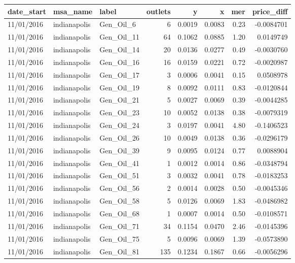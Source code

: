 \documentclass[
  letterpaper,
  DIV=11,
  numbers=noendperiod]{scrartcl}
\begin{document}
\begin{tabular}{l|l|l|r|r|r|r|r}
\hline
date\_start & msa\_name & label & outlets & y & x & mer & price\_diff\\
\hline
11/01/2016 & indianapolis & Gen\_Oil\_6 & 6 & 0.0019 & 0.0083 & 0.23 & -0.0084701\\
\hline
11/01/2016 & indianapolis & Gen\_Oil\_11 & 64 & 0.1062 & 0.0885 & 1.20 & 0.0149749\\
\hline
11/01/2016 & indianapolis & Gen\_Oil\_14 & 20 & 0.0136 & 0.0277 & 0.49 & -0.0030760\\
\hline
11/01/2016 & indianapolis & Gen\_Oil\_16 & 16 & 0.0159 & 0.0221 & 0.72 & -0.0020987\\
\hline
11/01/2016 & indianapolis & Gen\_Oil\_17 & 3 & 0.0006 & 0.0041 & 0.15 & 0.0508978\\
\hline
11/01/2016 & indianapolis & Gen\_Oil\_19 & 8 & 0.0092 & 0.0111 & 0.83 & -0.0120844\\
\hline
11/01/2016 & indianapolis & Gen\_Oil\_21 & 5 & 0.0027 & 0.0069 & 0.39 & -0.0044285\\
\hline
11/01/2016 & indianapolis & Gen\_Oil\_23 & 10 & 0.0052 & 0.0138 & 0.38 & -0.0079319\\
\hline
11/01/2016 & indianapolis & Gen\_Oil\_24 & 3 & 0.0197 & 0.0041 & 4.80 & -0.1406523\\
\hline
11/01/2016 & indianapolis & Gen\_Oil\_26 & 10 & 0.0049 & 0.0138 & 0.36 & -0.0296179\\
\hline
11/01/2016 & indianapolis & Gen\_Oil\_39 & 9 & 0.0095 & 0.0124 & 0.77 & 0.0088904\\
\hline
11/01/2016 & indianapolis & Gen\_Oil\_41 & 1 & 0.0012 & 0.0014 & 0.86 & -0.0348794\\
\hline
11/01/2016 & indianapolis & Gen\_Oil\_51 & 3 & 0.0032 & 0.0041 & 0.78 & -0.0183253\\
\hline
11/01/2016 & indianapolis & Gen\_Oil\_56 & 2 & 0.0014 & 0.0028 & 0.50 & -0.0045346\\
\hline
11/01/2016 & indianapolis & Gen\_Oil\_58 & 5 & 0.0126 & 0.0069 & 1.83 & -0.0486982\\
\hline
11/01/2016 & indianapolis & Gen\_Oil\_68 & 1 & 0.0007 & 0.0014 & 0.50 & -0.0108571\\
\hline
11/01/2016 & indianapolis & Gen\_Oil\_71 & 34 & 0.1154 & 0.0470 & 2.46 & -0.0145396\\
\hline
11/01/2016 & indianapolis & Gen\_Oil\_75 & 5 & 0.0096 & 0.0069 & 1.39 & -0.0573890\\
\hline
11/01/2016 & indianapolis & Gen\_Oil\_81 & 135 & 0.1234 & 0.1867 & 0.66 & -0.0056296\\

\end{tabular}
\end{document}
